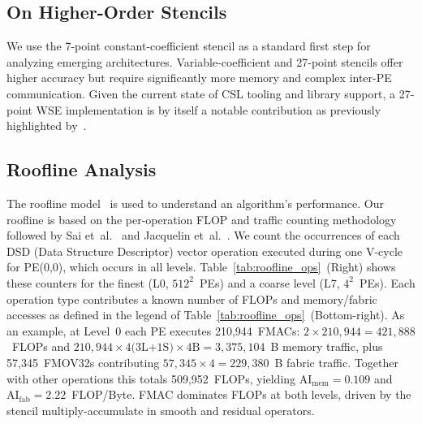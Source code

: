\documentclass[conference]{IEEEtran}
\begin{document}
        {
            \subsection{On Higher-Order Stencils}

            We use the 7-point constant-coefficient stencil as a standard first step for analyzing emerging architectures. Variable-coefficient and 27-point stencils offer higher accuracy but require significantly more memory and complex inter-PE communication. Given the current state of CSL tooling and library support, a 27-point WSE implementation is by itself a notable contribution as previously highlighted by~\cite{mathias}.
        }
        
        
        \subsection{Roofline Analysis}
        
            The roofline model~\cite{roofline} is used to understand an algorithm's performance. Our roofline is based on the per-operation FLOP and traffic counting methodology followed by Sai et~al.~\cite{sai_fv_sc24} and Jacquelin et~al.~\cite{mathias}. We count the occurrences of each DSD (Data Structure Descriptor) vector operation executed during one V-cycle for PE(0,0), which occurs in all levels. Table~\ref{tab:roofline_ops}~(Right) shows these counters for the finest (L0, $512^2$~PEs) and a coarse level (L7, $4^2$~PEs). Each operation type contributes a known number of FLOPs and memory/fabric accesses as defined in the legend of Table~\ref{tab:roofline_ops}~(Bottom-right). As an example, at Level~0 each PE executes 210,944~FMACs: $2 \times 210{,}944 = 421{,}888$~FLOPs and $210{,}944 \times 4\text{(3L+1S)} \times 4\text{B} = 3{,}375{,}104$~B memory traffic, plus 57,345~FMOV32s contributing $57{,}345 \times 4 = 229{,}380$~B fabric traffic. Together with other operations this totals 509,952~FLOPs, yielding $\text{AI}_{\text{mem}} {=} 0.109$ and $\text{AI}_{\text{fab}} {=} 2.22$~FLOP/Byte. FMAC dominates FLOPs at both levels, driven by the stencil multiply-accumulate in smooth and residual operators.
\end{document}
